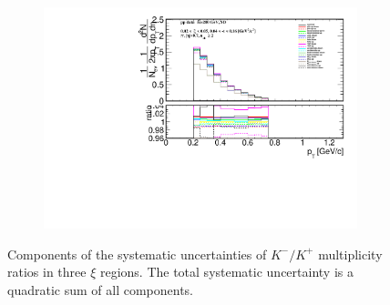\begin{figure}[h!]
\begin{subfigure}{.49\textwidth}
		\includegraphics[width=\textwidth,page=24]{chapters/chrgSTAR/img/syst/outPID_SDT.pdf}
	\end{subfigure}
	\begin{minipage}{.49\textwidth}
		\caption[Components of the systematic uncertainties of $K^-/K^+$ multiplicity ratios  in three $\xi$ regions]{Components of the systematic uncertainties of $K^-/K^+$ multiplicity ratios  in three $\xi$ regions. The total  systematic uncertainty is a quadratic sum of all  components.}
		\label{fig:results_star_syst_K}
	\end{minipage}
\end{figure}
